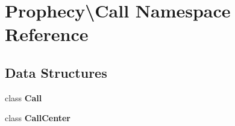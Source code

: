 \section{Prophecy\textbackslash{}Call Namespace Reference}
\label{namespace_prophecy_1_1_call}
\subsection*{Data Structures}
\begin{DoxyCompactItemize}
\item 
class {\bf Call}
\item 
class {\bf Call\+Center}
\end{DoxyCompactItemize}
